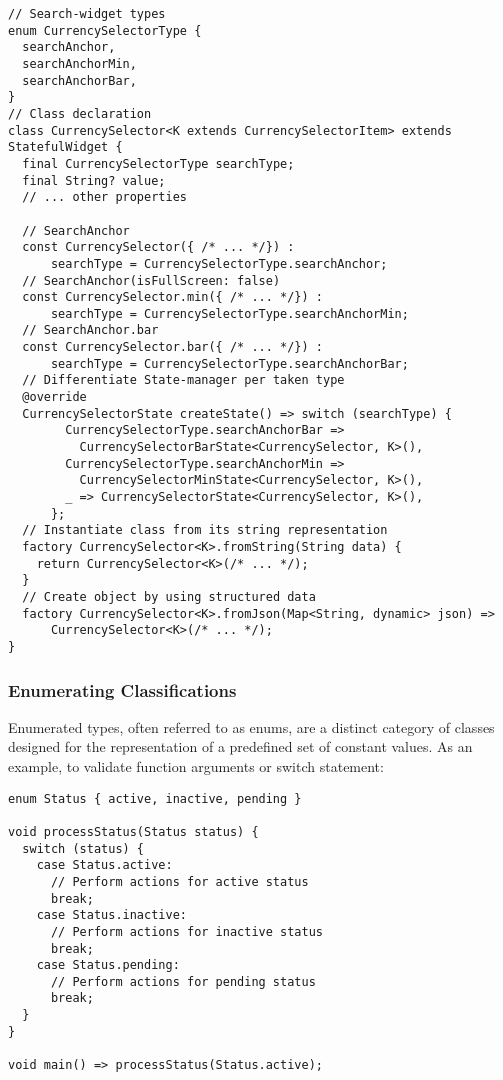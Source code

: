 \begin{lstlisting}
// Search-widget types
enum CurrencySelectorType {
  searchAnchor,
  searchAnchorMin,
  searchAnchorBar,
}
// Class declaration
class CurrencySelector<K extends CurrencySelectorItem> extends StatefulWidget {
  final CurrencySelectorType searchType;
  final String? value;
  // ... other properties

  // SearchAnchor
  const CurrencySelector({ /* ... */}) : 
      searchType = CurrencySelectorType.searchAnchor;
  // SearchAnchor(isFullScreen: false)
  const CurrencySelector.min({ /* ... */}) : 
      searchType = CurrencySelectorType.searchAnchorMin;
  // SearchAnchor.bar
  const CurrencySelector.bar({ /* ... */}) : 
      searchType = CurrencySelectorType.searchAnchorBar;
  // Differentiate State-manager per taken type
  @override
  CurrencySelectorState createState() => switch (searchType) {
        CurrencySelectorType.searchAnchorBar =>
          CurrencySelectorBarState<CurrencySelector, K>(),
        CurrencySelectorType.searchAnchorMin =>
          CurrencySelectorMinState<CurrencySelector, K>(),
        _ => CurrencySelectorState<CurrencySelector, K>(),
      };
  // Instantiate class from its string representation 
  factory CurrencySelector<K>.fromString(String data) {
    return CurrencySelector<K>(/* ... */);
  }
  // Create object by using structured data
  factory CurrencySelector<K>.fromJson(Map<String, dynamic> json) =>
      CurrencySelector<K>(/* ... */);
}
\end{lstlisting}


\newpage
\subsubsection{Enumerating Classifications}

Enumerated types, often referred to as enums, are a distinct category of classes designed for the representation of a 
predefined set of constant values. As an example, to validate function arguments or switch statement:

\begin{lstlisting}
enum Status { active, inactive, pending }

void processStatus(Status status) {
  switch (status) {
    case Status.active:
      // Perform actions for active status
      break;
    case Status.inactive:
      // Perform actions for inactive status
      break;
    case Status.pending:
      // Perform actions for pending status
      break;
  }
}

void main() => processStatus(Status.active);
\end{lstlisting}

